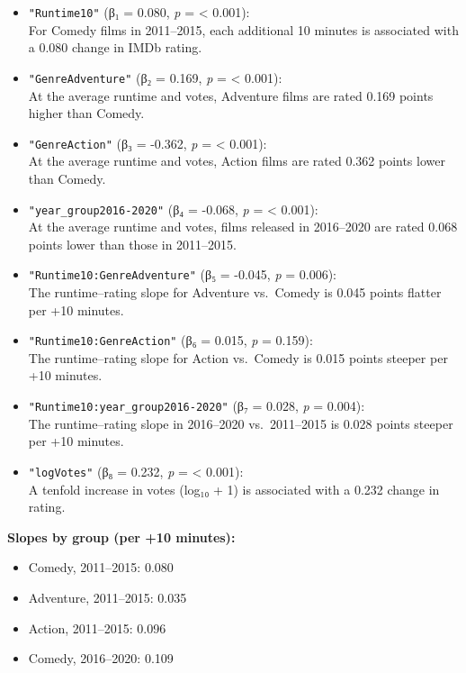 \documentclass[
]{article}
\providecommand{\tightlist}{%
  \setlength{\itemsep}{0pt}\setlength{\parskip}{0pt}}
\begin{document}
\begin{itemize}
\item
  \texttt{"Runtime10"} (β₁ = 0.080, \emph{p} = \textless{} 0.001):\\
  For Comedy films in 2011--2015, each additional 10 minutes is
  associated with a 0.080 change in IMDb rating.
\item
  \texttt{"GenreAdventure"} (β₂ = 0.169, \emph{p} = \textless{}
  0.001):\\
  At the average runtime and votes, Adventure films are rated 0.169
  points higher than Comedy.
\item
  \texttt{"GenreAction"} (β₃ = -0.362, \emph{p} = \textless{} 0.001):\\
  At the average runtime and votes, Action films are rated 0.362 points
  lower than Comedy.
\item
  \texttt{"year\_group2016-2020"} (β₄ = -0.068, \emph{p} = \textless{}
  0.001):\\
  At the average runtime and votes, films released in 2016--2020 are
  rated 0.068 points lower than those in 2011--2015.
\item
  \texttt{"Runtime10:GenreAdventure"} (β₅ = -0.045, \emph{p} = 0.006):\\
  The runtime--rating slope for Adventure vs.~Comedy is 0.045 points
  flatter per +10 minutes.
\item
  \texttt{"Runtime10:GenreAction"} (β₆ = 0.015, \emph{p} = 0.159):\\
  The runtime--rating slope for Action vs.~Comedy is 0.015 points
  steeper per +10 minutes.
\item
  \texttt{"Runtime10:year\_group2016-2020"} (β₇ = 0.028, \emph{p} =
  0.004):\\
  The runtime--rating slope in 2016--2020 vs.~2011--2015 is 0.028 points
  steeper per +10 minutes.
\item
  \texttt{"logVotes"} (β₈ = 0.232, \emph{p} = \textless{} 0.001):\\
  A tenfold increase in votes (log₁₀ + 1) is associated with a 0.232
  change in rating.
\end{itemize}

\textbf{Slopes by group (per +10 minutes):}

\begin{itemize}
\tightlist
\item
  Comedy, 2011--2015: 0.080\\
\item
  Adventure, 2011--2015: 0.035\\
\item
  Action, 2011--2015: 0.096\\
\item
  Comedy, 2016--2020: 0.109
\end{itemize}
\end{document}
